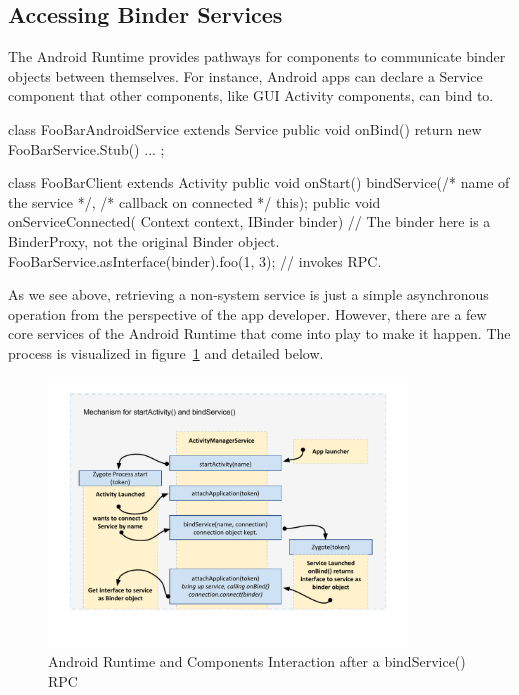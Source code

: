 \documentclass[prodmode]{acmlarge}
\begin{document}
\subsection{Accessing Binder Services}
The Android Runtime provides pathways for components to communicate binder objects between themselves. For instance, Android apps can declare a Service component that other components, like GUI Activity components, can bind to.

\begin{snippet}
class FooBarAndroidService extends Service {
  public void onBind() { return new FooBarService.Stub() { ... }; }
}

class FooBarClient extends Activity {
  public void onStart() { bindService(/* name of the service */,
                                      /* callback on connected */ this);
  }
  public void onServiceConnected(
    Context context, IBinder binder) {
    // The binder here is a BinderProxy, not the original Binder object.
    FooBarService.asInterface(binder).foo(1, 3);  // invokes RPC.
  }
}
\end{snippet}

As we see above, retrieving a non-system service is just a simple asynchronous operation from the perspective of the app developer. However, there are a few core services of the Android Runtime that come into play to make it happen. The process is visualized in figure~\ref{fig:BindService} and detailed below.

\begin{figure}[h]
\centering
\includegraphics[width=0.85\textwidth]{drawings/bindService.pdf}
\caption{Android Runtime and Components Interaction after a bindService() RPC}
\label{fig:BindService}
\end{figure}
\end{document}
